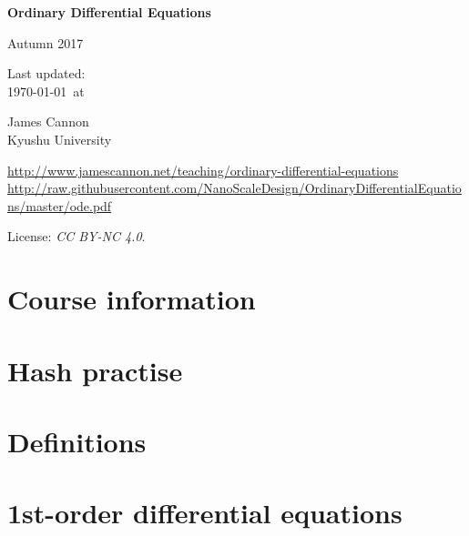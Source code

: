 \documentclass[a4paper]{book} %
\newcommand{\courseyear}{2017 }
\newcommand{\courseurl}{ordinary-differential-equations}
\begin{document}
\begin{titlepage}
    \begin{center}
        \vspace*{1cm}

        \Huge
        \textbf{Ordinary Differential Equations}

        Autumn \courseyear

        \vspace{1.5cm}
        \Large
        Last updated:\\\today \ at \currenttime

        \vspace{4.0cm}
        \LARGE
        James Cannon\\Kyushu University
        \vfill

        \normalsize
        \url{http://www.jamescannon.net/teaching/\courseurl}\\
        \vspace{0.3cm}
        \small
        \url{http://raw.githubusercontent.com/NanoScaleDesign/OrdinaryDifferentialEquations/master/ode.pdf}
        \vspace{0.5cm}

        License: \emph{CC BY-NC 4.0}.

    \end{center}
\end{titlepage}

\setcounter{chapter}{-1}

\tableofcontents

\chapter{Course information}
\newpage






\chapter{Hash practise}

\chapter{Definitions}

\chapter{1st-order differential equations}

\end{document}
